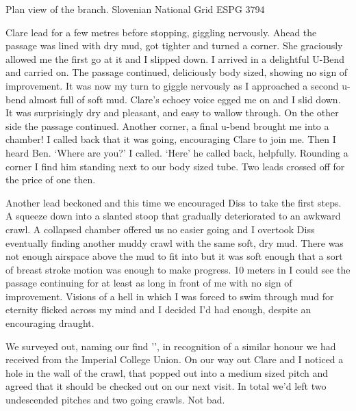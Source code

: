 \begin{marginfigure}
 \caption*{Plan view of the \protect{} branch. Slovenian National Grid ESPG 3794}
 \label{halleujah inset}
\end{marginfigure}

Clare lead for a few metres before stopping, giggling nervously. Ahead the passage was lined with dry mud, got tighter and turned a corner. She graciously allowed me the first go at it and I slipped down. I arrived in a delightful U-Bend and carried on. The passage continued, deliciously body sized, showing no sign of improvement. It was now my turn to giggle nervously as I approached a second u-bend almost full of soft mud. Clare’s echoey voice egged me on and I slid down. It was surprisingly dry and pleasant, and easy to wallow through. On the other side the passage continued. Another corner, a final  u-bend brought me into a chamber! I called back that it was going, encouraging Clare to join me. Then I heard Ben. 
‘Where are you?’ I called. 
‘Here’ he called back, helpfully. 
Rounding a corner I find him standing next to our body sized tube. Two leads crossed off for the price of one then.
 
Another lead beckoned and this time we encouraged Diss to take the first steps. A squeeze down into a slanted stoop that gradually deteriorated to an awkward crawl. A collapsed chamber offered us no easier going and I overtook Diss eventually finding another muddy crawl with the same soft, dry mud. There was not enough airspace above the mud to fit into but it was soft enough that a sort of breast stroke motion was enough to make progress. 10 meters in I could see the passage continuing for at least as long in front of me with no sign of improvement. Visions of a hell in which I was forced to swim through mud for eternity flicked across my mind and I decided I’d had enough, despite an encouraging draught.
 
We surveyed out, naming our find '', in recognition of a similar honour we had received from the Imperial College Union. On our way out Clare and I noticed a hole in the wall of the crawl, that popped out into a medium sized pitch and agreed that it should be checked out on our next visit. In total we’d left two undescended pitches and two going crawls. Not bad.
 
